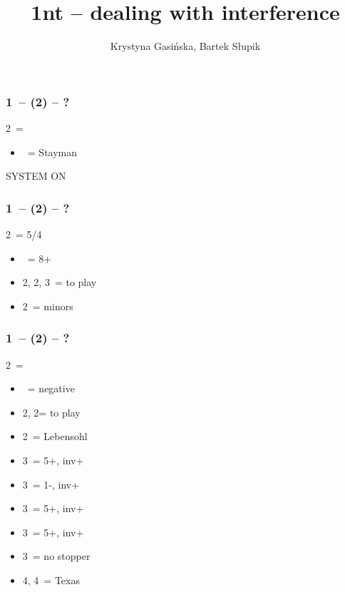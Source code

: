 \documentclass[12pt, a4paper]{article}
\title{1nt -- dealing with interference}
\author{Krystyna Gasińska, Bartek Słupik}
\begin{document}
\maketitle


\subsubsection*{1\nt\ -- (2\clubs) -- ?}
2\clubs\ = \clubs
\begin{itemize}
    \item \dbl\ = Stayman
\end{itemize}

SYSTEM ON

\subsubsection*{1\nt\ -- (2\clubs\alrts) -- ?}
2\clubs\ = 5/4 \major
\begin{itemize}
    \item \dbl\ = 8+
    \item 2\hearts, 2\spades, 3\clubs\ = to play
    \item 2\nt\ = minors
\end{itemize}

\subsubsection*{1\nt\ -- (2\diams) -- ?}
2\diams\ = \diams
\begin{itemize}
    \item \dbl\ = negative
    \item 2\hearts, 2\spades = to play
    \item 2\nt\ = Lebensohl
    \item 3\clubs\ = 5+\hearts, inv+
    \item 3\diams\ = 1-\diams, inv+
    \item 3\hearts\ = 5+\spades, inv+
    \item 3\spades\ = 5+\clubs, inv+
    \item 3\nt\ = no \diams stopper
    \item 4\diams, 4\hearts\ = Texas
\end{itemize}
\end{document}
